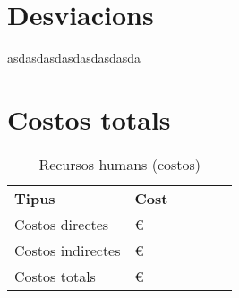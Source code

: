 \section{Desviacions}
	asdasdasdasdasdasdasda

\section{Costos totals}
	\begin{table}[H]
		\begin{center}
			\begin{tabular}{l !{\vrule width -1pt}l !{\vrule width -1pt}l !{\vrule width -1pt}l !{\vrule width -1pt}l !{\vrule width -1pt}l}
				\textbf{Tipus} & \textbf{Cost} \\
				Costos directes & € \\
				Costos indirectes & € \\
				Costos totals & € \\
			\end{tabular}
		\end{center}
		\caption{Recursos humans (costos)}
	\end{table}
